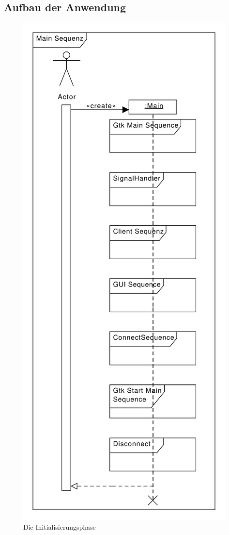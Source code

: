 \subsection{Aufbau der Anwendung}
\begin{figure}[htb!]
	\centering
        \includegraphics[scale=0.5]{MainSequenz.pdf}
	\caption{Die Initialisierungsphase}
	\label{seq_main_init}
\end{figure}






